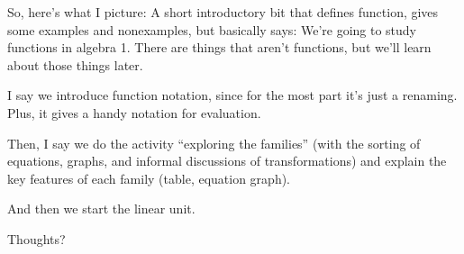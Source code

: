 So, here's what I picture: A short introductory bit that defines function, gives some examples and nonexamples, but basically says: We're going to study functions in algebra 1. There are things that aren't functions, but we'll learn about those things later.

I say we introduce function notation, since for the most part it's just a renaming. Plus, it gives a handy notation for evaluation.

Then, I say we do the activity ``exploring the families'' (with the sorting of equations, graphs, and informal discussions of transformations) and explain the key features of each family (table, equation graph).

And then we start the linear unit.

Thoughts?

